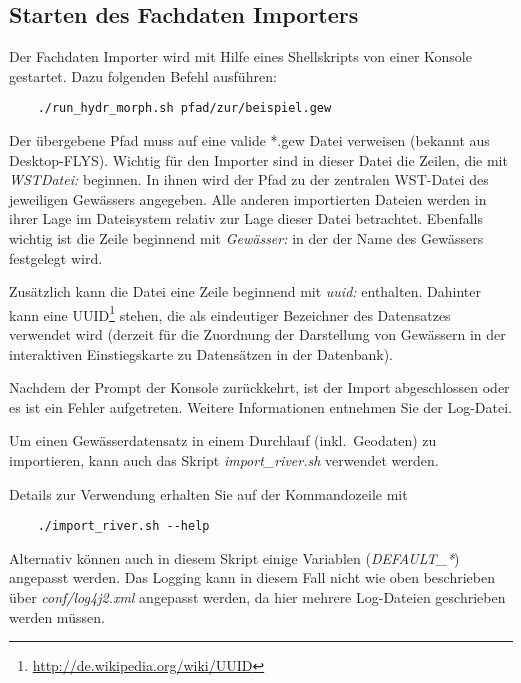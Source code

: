 \subsection{Starten des Fachdaten Importers}
\label{start-hydr}
Der Fachdaten Importer wird mit Hilfe eines Shellskripts von einer Konsole
gestartet. Dazu folgenden Befehl ausführen:\\

\begin{lstlisting}
    ./run_hydr_morph.sh pfad/zur/beispiel.gew
\end{lstlisting}

Der übergebene Pfad muss auf eine valide *.gew Datei verweisen (bekannt aus
Desktop-FLYS). Wichtig für den Importer sind in dieser Datei die Zeilen, die mit
\textit{WSTDatei:} beginnen. In ihnen wird der Pfad zu der zentralen WST-Datei
des jeweiligen Gewässers angegeben. Alle anderen importierten Dateien werden in
ihrer Lage im Dateisystem relativ zur Lage dieser Datei betrachtet.
Ebenfalls wichtig ist die Zeile beginnend mit \textit{Gewässer:}
in der der Name des Gewässers festgelegt wird.

Zusätzlich kann die Datei eine Zeile beginnend mit \textit{uuid:}
enthalten. Dahinter kann eine
UUID\footnote{\url{http://de.wikipedia.org/wiki/UUID}} stehen,
die als eindeutiger Bezeichner des Datensatzes verwendet wird
(derzeit für die Zuordnung der Darstellung von Gewässern in der
interaktiven Einstiegskarte zu Datensätzen in der Datenbank).

Nachdem der Prompt der Konsole zurückkehrt, ist der Import abgeschlossen oder es
ist ein Fehler aufgetreten. Weitere Informationen entnehmen Sie der Log-Datei.

Um einen Gewässerdatensatz in einem Durchlauf (inkl.\ Geodaten)
zu importieren, kann auch das Skript \textit{import\_river.sh} verwendet werden.

Details zur Verwendung erhalten Sie auf der Kommandozeile mit
\begin{lstlisting}
    ./import_river.sh --help
\end{lstlisting}
Alternativ können auch in diesem Skript einige Variablen
(\textit{DEFAULT\_*}) angepasst werden.
Das Logging kann in diesem Fall nicht wie oben beschrieben
über \textit{conf/log4j2.xml} angepasst werden, da hier
mehrere Log-Dateien geschrieben werden müssen.
